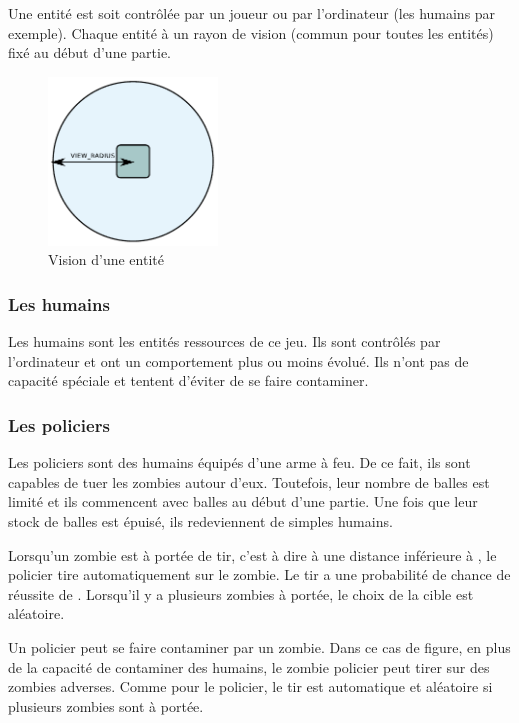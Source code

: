 Une entité est soit contrôlée par un joueur ou par l'ordinateur (les humains par exemple).
Chaque entité à un rayon de vision \viewradius{} (commun pour toutes les entités) fixé au début d'une partie.

\begin{figure}[htbp]
    \centering
    \includegraphics[width=0.4\textwidth]{pics/entite_view}
    \caption{Vision d'une entité}
    \label{view}
\end{figure}

\subsubsection{Les humains} %
Les humains sont les entités ressources de ce jeu.
Ils sont contrôlés par l'ordinateur et ont un comportement plus ou moins évolué.
Ils n'ont pas de capacité spéciale et tentent d'éviter de se faire contaminer.



\subsubsection{Les policiers} %
Les policiers sont des humains équipés d'une arme à feu.
De ce fait, ils sont capables de tuer les zombies autour d'eux.
Toutefois, leur nombre de balles est limité et ils commencent avec \bulletamount{} balles au début d'une partie.
Une fois que leur stock de balles est épuisé, ils redeviennent de simples humains.

Lorsqu'un zombie est à portée de tir, c'est à dire à une distance inférieure à \shotradius{}, le policier tire automatiquement sur le zombie.
Le tir a une probabilité de chance de réussite de \shotsuccess{}.
Lorsqu'il y a plusieurs zombies à portée, le choix de la cible est aléatoire.

Un policier peut se faire contaminer par un zombie.
Dans ce cas de figure, en plus de la capacité de contaminer des humains, le zombie policier peut tirer sur des zombies adverses.
Comme pour le policier, le tir est automatique et aléatoire si plusieurs zombies sont à portée.

